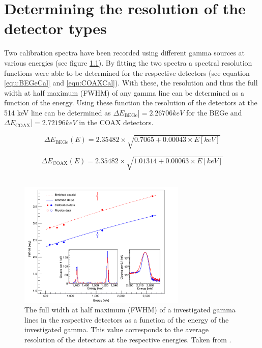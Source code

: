 \appendix

\chapter{Determining the resolution of the detector types}
\label{sec:ResDetermination}


Two calibration spectra have been recorded using different gamma sources at various energies (see figure \ref{fig:Aufloesung})\cite{agostini_background_2017}.
By fitting the two spectra a spectral resolution functions were able to be determined for the respective detectors (see equation \ref{equ:BEGeCal} and \ref{equ:COAXCal}).
With these, the resolution and thus the full width at half maximum (FWHM) of any gamma line can be determined as a function of the energy.
Using these function the resolution of the detectors at the 514 keV line can be determined as $\Delta E_{\mathrm{BEGe}}] =2.26706\unit{keV}$ for the BEGe and $\Delta E_{\mathrm{COAX}}] = 2.72196\unit{keV}$ in the COAX detectors.



\begin{equation}
\Delta E_{\mathrm{BEGe}}(E) = 2.35482 \times \sqrt{0.7065+0.00043\times E[\unit{keV}]}
\label{equ:BEGeCal}
\end{equation}

\begin{equation}
\Delta E_{\mathrm{COAX}}(E) = 2.35482 \times \sqrt{1.01314+0.00063\times E[\unit{keV}]}
\label{equ:COAXCal}
\end{equation}
\\

\begin{figure}[t!]
	\centering
	\ifmakefigures%
	\includegraphics[width=80mm]{./Bilder/Aufloesung.png}
	\fi%
	\caption{
		The full width at half maximum (FWHM) of a investigated gamma lines in the respective detectors as a function of the energy of the investigated gamma.
		This value corresponds to the average resolution of the detectors at the respective energies.
		Taken from \cite{agostini_background_2017}.
	}
	\label{fig:Aufloesung}
\end{figure}


